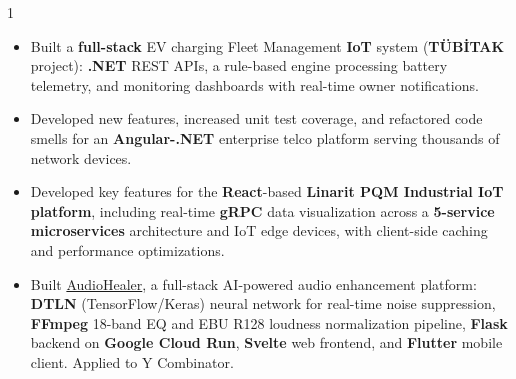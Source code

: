 \documentclass[11pt,a4paper]{altacv}
\begin{document}
\begin{paracol}{1}
\divider

\begin{itemize}
  \item Built a \textbf{full-stack} EV charging Fleet Management \textbf{IoT} system (\textbf{TÜBİTAK} project): \textbf{.NET} REST APIs, a rule-based engine processing battery telemetry, and monitoring dashboards with real-time owner notifications.
\end{itemize}

\divider

\begin{itemize}
  \item Developed new features, increased unit test coverage, and refactored code smells for an \textbf{Angular-.NET} enterprise telco platform serving thousands of network devices.
\end{itemize}

\divider

\begin{itemize}
  \item Developed key features for the \textbf{React}-based \textbf{Linarit PQM Industrial IoT platform}, including real-time \textbf{gRPC} data visualization across a \textbf{5-service microservices} architecture and IoT edge devices, with client-side caching and performance optimizations.
\end{itemize}

\divider

\begin{itemize}
  \item Built \href{https://www.audiohealer.com}{AudioHealer}, a full-stack AI-powered audio enhancement platform: \textbf{DTLN} (TensorFlow/Keras) neural network for real-time noise suppression, \textbf{FFmpeg} 18-band EQ and EBU R128 loudness normalization pipeline, \textbf{Flask} backend on \textbf{Google Cloud Run}, \textbf{Svelte} web frontend, and \textbf{Flutter} mobile client. Applied to Y Combinator.
\end{itemize}


\end{paracol}
\end{document}
